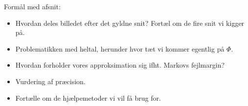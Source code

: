 {
Formål med afsnit:
\begin{itemize}
	\item Hvordan deles billedet efter det gyldne snit? Fortæl om de
		fire snit vi kigger på.
	\item Problematikken med heltal, herunder hvor tæt vi kommer
		egentlig på $\varPhi$.
	\item Hvordan forholder vores approksimation sig ifht. Markovs
		fejlmargin?
	\item Vurdering af præcision.
	\item Fortælle om de hjælpemetoder vi vil få brug for.
\end{itemize}

}

